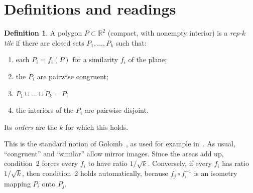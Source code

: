 \documentclass[11pt]{article}
\theoremstyle{definition}
\newtheorem{definition}[theorem]{Definition}
\theoremstyle{remark}
\begin{document}
\section{Definitions and readings}\label{sec:defs}

\begin{definition}\label{def:rep}
A polygon $P\subset\mathbb R^2$ (compact, with nonempty interior) is a \emph{rep-$k$ tile}
if there are closed sets $P_1,\dots,P_k$ such that:
\begin{enumerate}
\item each $P_i=f_i(P)$ for a similarity $f_i$ of the plane;
\item the $P_i$ are pairwise congruent;
\item $P_1\cup\dots\cup P_k=P$;
\item the interiors of the $P_i$ are pairwise disjoint.
\end{enumerate}
Its \emph{orders} are the $k$ for which this holds.
\end{definition}

This is the standard notion of Golomb~\cite{golomb}, as used for example in~\cite{snover}.
As usual, ``congruent'' and ``similar'' allow mirror images. Since the areas add up,
condition~2 forces every $f_i$ to have ratio $1/\sqrt k$. Conversely, if every $f_i$ has
ratio $1/\sqrt k$, then condition~2 holds automatically, because $f_j\circ f_i^{-1}$ is
an isometry mapping $P_i$ onto $P_j$.
\end{document}
